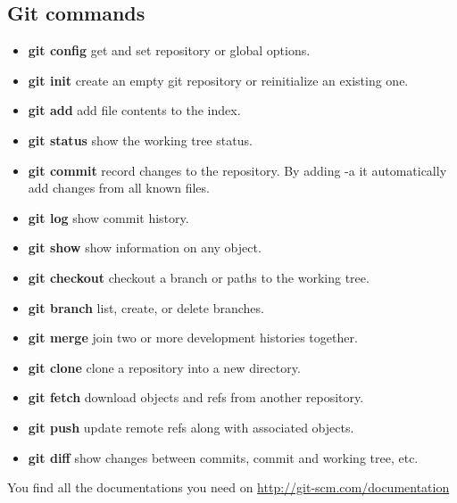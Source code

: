 \documentclass[10pt,a4paper]{scrartcl}
\begin{document}
\subsection{Git commands}
\begin{doublespacing}
\begin{itemize}
\item{\bf{git config}} \qquad  get and set repository or global options.
\item{\bf{git init}} \qquad create an empty git repository or reinitialize an existing one.
\item{\bf{git add}} \qquad add file contents to the index.
\item{\bf{git status}} \qquad show the working tree status.
\item{\bf{git commit}} \qquad record changes to the repository. By adding -a it automatically add changes from all known files.
\item{\bf{git log}} \qquad show commit history.
\item{\bf{git show}} \qquad show information on any object.
\item{\bf{git checkout}} \qquad checkout a branch or paths to the working tree.
\item{\bf{git branch}} \qquad list, create, or delete branches.
\item{\bf{git merge}} \qquad join two or more development histories together.
\item{\bf{git clone}} \qquad clone a repository into a new directory.
\item{\bf{git fetch}} \qquad download objects and refs from another repository.
\item{\bf{git push}} \qquad update remote refs along with associated objects.
\item{\bf{git diff}} \qquad show changes between commits, commit and working tree, etc.
\end{itemize}
\end{doublespacing}
\begin{singlespacing}
You find all the documentations you need on \url{http://git-scm.com/documentation}
\end{singlespacing}






\end{document}
